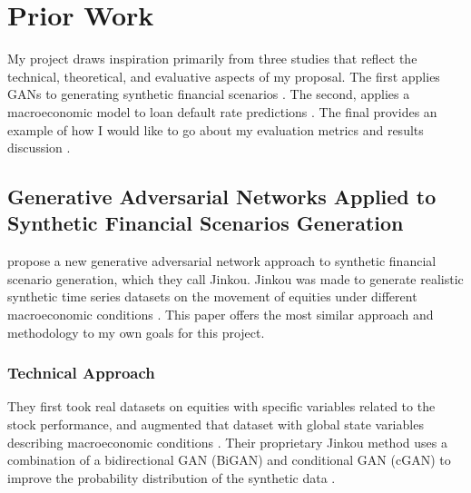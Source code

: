 \documentclass[10pt,twocolumn]{article}
\begin{document}
\section{Prior Work}
My project draws inspiration primarily from three studies that reflect the technical, theoretical, and evaluative aspects of my proposal. The first applies GANs to generating synthetic financial scenarios \cite{rizzato2023generativeadversarial}. The second, applies a macroeconomic model to loan default rate predictions \cite{baltazar2020sustainableeconomies}. The final provides an example of how I would like to go about my evaluation metrics and results discussion \cite{yuan2024multifacetedevaluation}.

\subsection{Generative Adversarial Networks Applied to Synthetic Financial Scenarios Generation}
\textcite{rizzato2023generativeadversarial} propose a new generative adversarial network approach to synthetic financial scenario generation, which they call Jinkou. Jinkou was made to generate realistic synthetic time series datasets on the movement of equities under different macroeconomic conditions \cite{rizzato2023generativeadversarial}. This paper offers the most similar approach and methodology to my own goals for this project. 

\subsubsection{Technical Approach}
They first took real datasets on equities with specific variables related to the stock performance, and augmented that dataset with global state variables describing macroeconomic conditions \cite{rizzato2023generativeadversarial}. Their proprietary Jinkou method uses a combination of a bidirectional GAN (BiGAN) and conditional GAN (cGAN) to improve the probability distribution of the synthetic data \cite{rizzato2023generativeadversarial}. 
\end{document}
